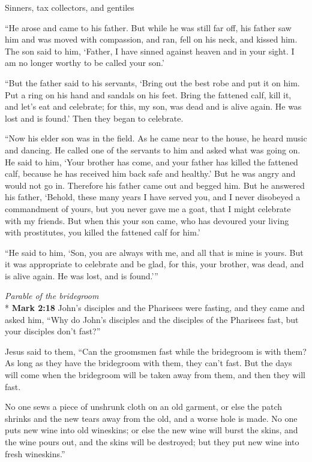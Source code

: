 \documentclass[10pt,twoside]{article} %
\newcommand{\quotesize}{\normalsize{}}
\newenvironment{quotetext}{\begingroup\quotesize}{\endgroup}
\newcommand{\intex}[1]{\index[texts]{#1}}
\newcommand{\bible}[2]{\begin{quotetext}\textbf{#1}\intex{#1} #2\end{quotetext}}
\newcommand{\gospelmark}[2]{\bible{Mark #1}{#2}}
\newcommand{\subhead}[1]{\emph{#1}\\*}
\begin{document}
\begin{section}{Sinners, tax collectors, and gentiles}
{   ``He arose and came to his father. But while he was still far off, his father saw him and was moved with compassion, and ran, fell on his neck, and kissed him.    The son said to him, `Father, I have sinned against heaven and in your sight. I am no longer worthy to be called your son.'

   ``But the father said to his servants, `Bring out the best robe and put it on him. Put a ring on his hand and sandals on his feet.    Bring the fattened calf, kill it, and let's eat and celebrate;    for this, my son, was dead and is alive again. He was lost and is found.' Then they began to celebrate.

   ``Now his elder son was in the field. As he came near to the house, he heard music and dancing.    He called one of the servants to him and asked what was going on.    He said to him, `Your brother has come, and your father has killed the fattened calf, because he has received him back safe and healthy.'    But he was angry and would not go in. Therefore his father came out and begged him.    But he answered his father, `Behold, these many years I have served you, and I never disobeyed a commandment of yours, but you never gave me a goat, that I might celebrate with my friends.    But when this your son came, who has devoured your living with prostitutes, you killed the fattened calf for him.'

   ``He said to him, `Son, you are always with me, and all that is mine is yours.    But it was appropriate to celebrate and be glad, for this, your brother, was dead, and is alive again. He was lost, and is found.'{}'' 
}

\subhead{Parable of the bridegroom}
\gospelmark{2:18}{John's disciples and the Pharisees were fasting, and they came and asked him, ``Why do John's disciples and the disciples of the Pharisees fast, but your disciples don't fast?''

  Jesus said to them, ``Can the groomsmen fast while the bridegroom is with them? As long as they have the bridegroom with them, they can't fast.    But the days will come when the bridegroom will be taken away from them, and then they will fast.

    No one sews a piece of unshrunk cloth on an old garment, or else the patch shrinks and the new tears away from the old, and a worse hole is made.    No one puts new wine into old wineskins; or else the new wine will burst the skins, and the wine pours out, and the skins will be destroyed; but they put new wine into fresh wineskins.'' }


\end{section}
\end{document}
